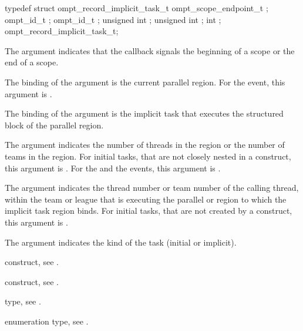 \record
\begin{ccppspecific}
\begin{omptRecord}
typedef struct ompt_record_implicit_task_t {
  ompt_scope_endpoint_t ;
  ompt_id_t ;
  ompt_id_t ;
  unsigned int ;
  unsigned int ;
  int ;
} ompt_record_implicit_task_t;
\end{omptRecord}
\end{ccppspecific}

\argdesc
The  argument indicates that the callback signals
the beginning of a scope or the end of a scope.

The binding of the  argument is the current parallel 
region. For the  event, this argument is .

The binding of the  argument is the implicit task that
executes the structured block of the parallel region.

The  argument indicates the number of threads in 
the  region or the number of teams in the  region.
For initial tasks, that are not closely nested in a  construct, 
this argument is . For the  and the 
 events, this argument is .

The  argument indicates the thread number or team number of the 
calling thread, within the team or league that is executing the parallel or 
 region to which the implicit task region binds. For initial tasks, 
that are not created by a  construct, this argument is .

The  argument indicates the kind of the task (initial or implicit).

\begin{crossrefs}
\item {} construct, see .

\item {} construct, see .

\item {} type, see .

\item {} enumeration type, see
.
\end{crossrefs}



